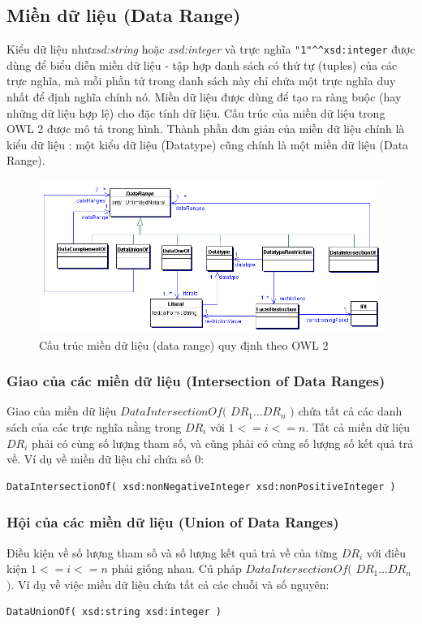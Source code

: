\subsection{Miền dữ liệu (Data Range)}
Kiểu dữ liệu như\textit{xsd:string} hoặc \textit{xsd:integer} và trực nghĩa \verb|"1"^^xsd:integer| được dùng để biểu diễn miền dữ liệu - tập hợp danh sách có thứ tự (tuples) của các trực nghĩa, mà mỗi phần tử trong danh sách này chỉ chứa một trực nghĩa duy nhất để định nghĩa chính nó. Miền dữ liệu được dùng để tạo ra ràng buộc (hay những dữ liệu hợp lệ) cho đặc tính dữ liệu. Cấu trúc của miền dữ liệu trong OWL 2 được mô tả trong hình. Thành phần đơn giản của miền dữ liệu chính là kiểu dữ liệu : một kiểu dữ liệu (Datatype) cũng chính là một miền dữ liệu (Data Range).
\begin{figure}[h!]
	\centering
	\includegraphics[width=120mm]{Figures/datarange.png}
	\caption{Cấu trúc miền dữ liệu (data range) quy định theo OWL 2\label{overflow}}
\end{figure}

\subsubsection{Giao của các miền dữ liệu (Intersection of Data Ranges)}
Giao của miền dữ liệu $DataIntersectionOf($ $DR_{1} ... DR_{n}$ $)$  chứa tất cả các danh sách của các trực nghĩa nằng trong $DR_{i}$ với $1 <= i <= n$. Tất cả miền dữ liệu $DR_{i}$ phải có cùng số lượng tham số, và cũng phải có cùng số lượng số kết quả trả về. Ví dụ về miền dữ liệu chỉ chứa số 0:
\begin{verbatim}
DataIntersectionOf( xsd:nonNegativeInteger xsd:nonPositiveInteger )
\end{verbatim}

\subsubsection{Hội của các miền dữ liệu (Union of Data Ranges)}
Điều kiện về số lượng tham số và số lượng kết quả trả về của từng $DR_{i}$ với điều kiện $1 <= i <= n$ phải giống nhau. Cú pháp $DataIntersectionOf($ $DR_{1} ... DR_{n}$ $)$. Ví dụ về việc miền dữ liệu chứa tất cả các chuỗi và số nguyên:
\begin{verbatim}
DataUnionOf( xsd:string xsd:integer )
\end{verbatim}

